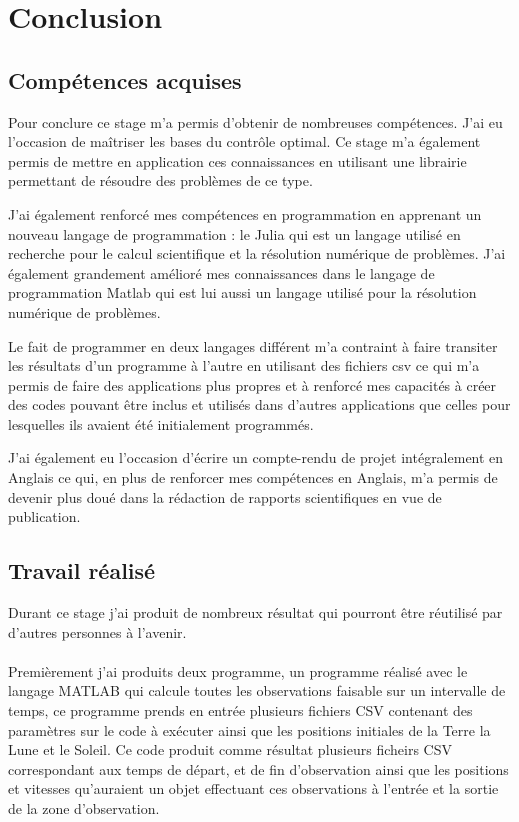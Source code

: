 \documentclass[11pt]{article} %
\begin{document}
		\section{Conclusion}
		\subsection{Compétences acquises}
		Pour conclure ce stage m'a permis d'obtenir de nombreuses compétences.
		 J'ai eu l'occasion de maîtriser les bases du contrôle optimal. Ce stage m'a également permis de mettre en application ces connaissances en utilisant une librairie permettant de résoudre des problèmes de ce type.
		
		J'ai également renforcé mes compétences en programmation en apprenant un nouveau langage de programmation : le Julia qui est un langage utilisé en recherche pour le calcul scientifique et la résolution numérique de problèmes. J'ai également grandement amélioré mes connaissances dans le langage de programmation Matlab qui est lui aussi un langage utilisé pour la résolution numérique de problèmes.
		
		Le fait de programmer en deux langages différent m'a contraint à faire transiter les résultats d'un programme à l'autre en utilisant des fichiers csv ce qui m'a permis de faire des applications plus propres et à renforcé mes capacités à créer des codes pouvant être inclus et utilisés dans d'autres applications que celles pour lesquelles ils avaient été initialement programmés.
		
		J'ai également eu l'occasion d'écrire un compte-rendu de projet intégralement en Anglais ce qui, en plus de renforcer mes compétences en Anglais, m'a permis de devenir plus doué dans la rédaction de rapports scientifiques en vue de publication.
		
		\subsection{Travail réalisé}
		
		Durant ce stage j'ai produit de nombreux résultat qui pourront être réutilisé par d'autres personnes à l'avenir. 
		\\ \\
		Premièrement j'ai produits deux programme, un programme réalisé avec le langage MATLAB qui calcule toutes les observations faisable sur un intervalle de temps, ce programme prends en entrée plusieurs fichiers CSV contenant des paramètres sur le code à exécuter ainsi que les positions initiales de la Terre la Lune et le Soleil. Ce code produit comme résultat plusieurs ficheirs CSV correspondant aux temps de départ, et de fin d'observation ainsi que les positions et vitesses qu'auraient un objet effectuant ces observations à l'entrée et la sortie de la zone d'observation.
		
\end{document}
